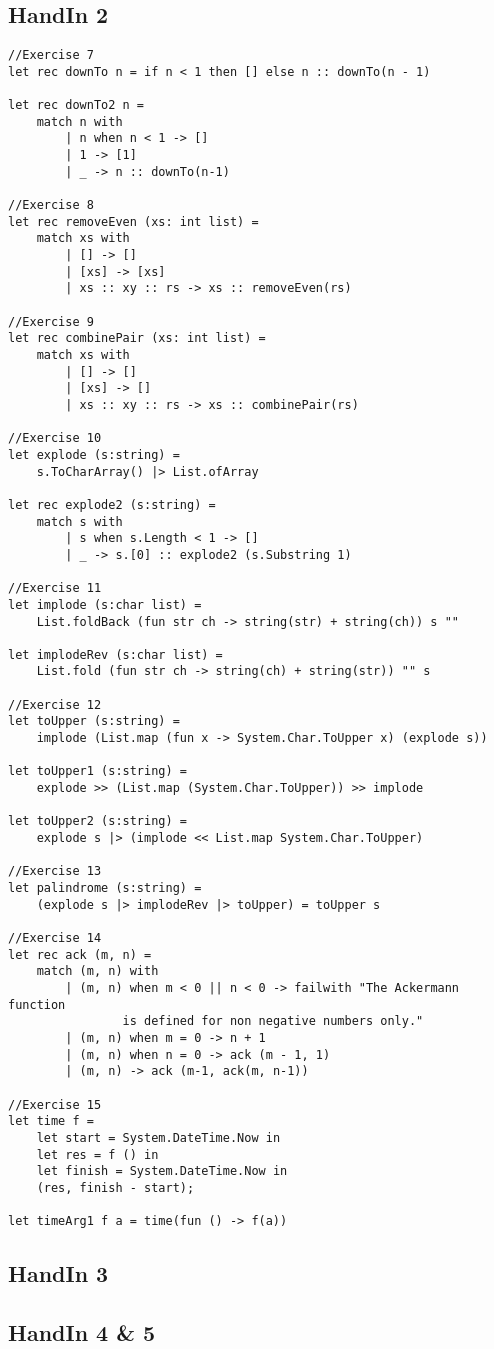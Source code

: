 \subsection{HandIn 2}
\label{Appendix_FSharp_Grooss_2}
\begin{lstlisting}
//Exercise 7
let rec downTo n = if n < 1 then [] else n :: downTo(n - 1)

let rec downTo2 n = 
    match n with
		| n when n < 1 -> []
        | 1 -> [1]
        | _ -> n :: downTo(n-1)

//Exercise 8
let rec removeEven (xs: int list) =
    match xs with
        | [] -> []
        | [xs] -> [xs]
        | xs :: xy :: rs -> xs :: removeEven(rs)

//Exercise 9
let rec combinePair (xs: int list) =
    match xs with
        | [] -> []
        | [xs] -> []
        | xs :: xy :: rs -> xs :: combinePair(rs)

//Exercise 10
let explode (s:string) =
    s.ToCharArray() |> List.ofArray

let rec explode2 (s:string) =
    match s with
        | s when s.Length < 1 -> []
        | _ -> s.[0] :: explode2 (s.Substring 1)

//Exercise 11
let implode (s:char list) =
    List.foldBack (fun str ch -> string(str) + string(ch)) s ""
    
let implodeRev (s:char list) =
    List.fold (fun str ch -> string(ch) + string(str)) "" s

//Exercise 12
let toUpper (s:string) =
    implode (List.map (fun x -> System.Char.ToUpper x) (explode s))

let toUpper1 (s:string) =
    explode >> (List.map (System.Char.ToUpper)) >> implode

let toUpper2 (s:string) =
    explode s |> (implode << List.map System.Char.ToUpper)

//Exercise 13
let palindrome (s:string) =
    (explode s |> implodeRev |> toUpper) = toUpper s

//Exercise 14
let rec ack (m, n) =
    match (m, n) with
        | (m, n) when m < 0 || n < 0 -> failwith "The Ackermann function 
				is defined for non negative numbers only."
        | (m, n) when m = 0 -> n + 1
        | (m, n) when n = 0 -> ack (m - 1, 1)
        | (m, n) -> ack (m-1, ack(m, n-1))

//Exercise 15
let time f =
    let start = System.DateTime.Now in
    let res = f () in
    let finish = System.DateTime.Now in
    (res, finish - start);

let timeArg1 f a = time(fun () -> f(a))
\end{lstlisting}
\subsection{HandIn 3}
\label{Appendix_FSharp_Grooss_3}
\subsection{HandIn 4 \& 5}
\label{Appendix_FSharp_Grooss_4and5}